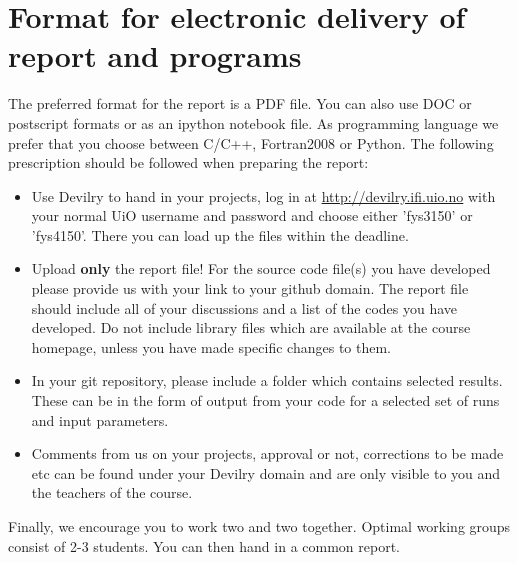 \documentclass[11pt,a4wide]{article}
\begin{document}
\section*{Format for electronic delivery of report and programs}
%
The preferred format for the report is a PDF file. You can also
use DOC or postscript formats or as an ipython notebook file. 
As programming language we prefer that you choose between C/C++, Fortran2008 or Python.
The following prescription should be followed when preparing the report:
\begin{itemize}
\item Use Devilry to hand in your projects, log in  at 
\url{ http://devilry.ifi.uio.no} with your normal UiO username and password
and choose either 'fys3150' or 'fys4150'.
There you can load up the files within the deadline.
\item Upload {\bf only} the report file!  For the source code file(s) you have developed please provide us with your link to your github domain. 
The report file should include all of your discussions and a list of the codes you have developed. 
Do not include library files which are available at the course homepage, unless you have
made specific changes to them.
\item In your git repository, please include a folder which contains selected results. These can be in the form of output from your code
for a selected set of runs and input parameters. 
\item Comments  from us on your projects, approval or not, corrections to be made 
etc can be found under
your Devilry domain and are only visible to you and the teachers of the course.

\end{itemize}

Finally, 
we encourage you to work two and two together. Optimal working groups consist of 
2-3 students. You can then hand in a common report. 
\end{document}
